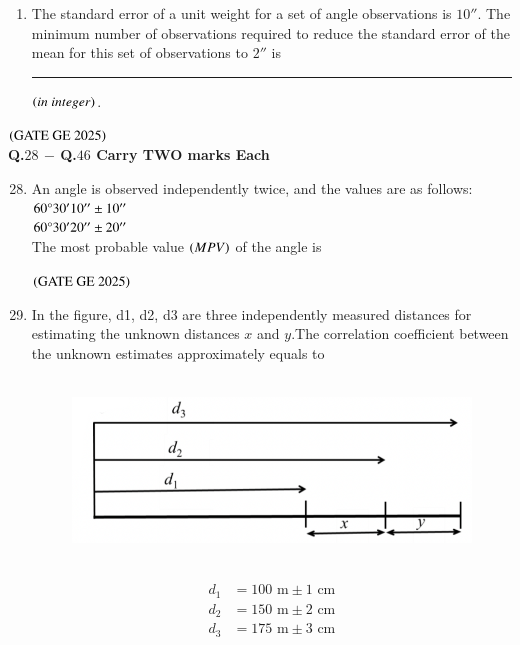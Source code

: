 \documentclass[journal,12pt,onecolumn]{IEEEtran}
\theoremstyle{remark}
\begin{document}
\begin{enumerate}
\item The standard error of a unit weight for a set of angle observations is $10''$.
The minimum number of observations required to reduce the standard error of the mean for this set of observations to $2''$ is \rule{2cm}{0.5mm} $\left(in\ integer\right)$.\\
\end{enumerate}
\hfill $\left(\text{GATE GE 2025}\right)$
\bigskip
\\
\textbf{Q.$28$ $-$ Q.$46$ Carry TWO marks Each}\\
\begin{enumerate}
\setcounter{enumi}{27}
\item An angle is observed independently twice, and the values are as follows:\\
$60\degree30'10'' \pm 10''$\\
$60\degree30'20'' \pm 20''$\\
The most probable value $\left(MPV\right)$ of the angle is
\begin{enumerate}
\end{enumerate}
\hfill $\left(\text{GATE GE 2025}\right)$
\bigskip
\item In the figure, d1, d2, d3 are three independently measured distances for estimating the unknown distances $x$ and $y$.The correlation coefficient between the unknown estimates approximately equals to\\
\\

\begin{figure}[H]
    \centering
    \includegraphics[width=0.5\columnwidth]{figs/fig5.png}
    \caption{}
    \label{figs:fig5}
\end{figure}\\

\begin{align*}
d_1 &= 100 \text{ m} \pm 1 \text{ cm} \\
d_2 &= 150 \text{ m} \pm 2 \text{ cm} \\
d_3 &= 175 \text{ m} \pm 3 \text{ cm}
\end{align*}


\end{enumerate}
\end{document}
